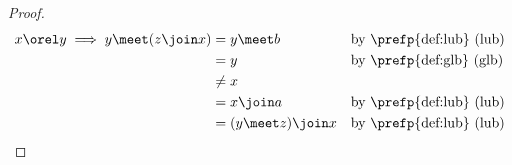 \begin{lemma}
\label{lem:latm_N5}
\end{lemma}
\begin{proof}
  \begin{align*}
    x\orel y \implies y \meet ( z\join x)
      &= y \meet b
      && \text{by \prefp{def:lub} (lub)}
    \\&= y
      && \text{by \prefp{def:glb} (glb)}
    \\&\ne  x
    \\&= x \join a
      && \text{by \prefp{def:lub} (lub)}
    \\&= (y \meet z) \join x
      && \text{by \prefp{def:lub} (lub)}
  \end{align*}
\end{proof}

